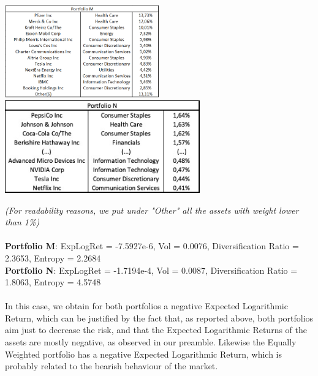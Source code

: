 \documentclass{assignment}
\begin{document}
\begin{center}
    \includegraphics[height=4cm]
    {assets/Port_M.png} 
    \quad
    \includegraphics[height=4cm]
    {assets/Port_N.jpg} 
\end{center}
\textit{(For readability reasons, we put under "Other" all the assets with weight lower than 1\%)}\\\\
\textbf{Portfolio M}: ExpLogRet = -7.5927e-6, Vol = 0.0076, Diversification Ratio = 2.3653, Entropy = 2.2684\\
\textbf{Portfolio N}: ExpLogRet = -1.7194e-4, Vol = 0.0087, Diversification Ratio = 1.8063, Entropy = 4.5748\\\\
In this case, we obtain for both portfolios a negative Expected Logarithmic Return, which can be justified by the fact that, as reported above, both portfolios aim just to decrease the risk, and that the Expected Logarithmic Returns of the assets are mostly negative, as observed in our preamble. Likewise the Equally Weighted portfolio has a negative Expected Logarithmic Return, which is probably related to the bearish behaviour of the market.
\end{document}
